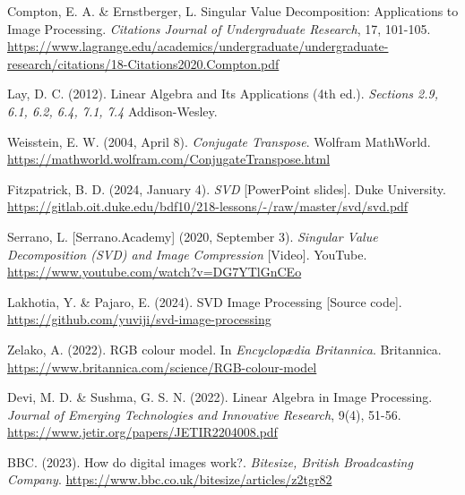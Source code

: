 \documentclass[12pt, reqno]{amsart}
\theoremstyle{definition}
\theoremstyle{remark}
\numberwithin{equation}{section}
\begin{document}

\begin{thebibliography}{99}

 Compton, E. A. \& Ernstberger, L. Singular Value Decomposition: Applications to Image Processing. \textit{Citations Journal of Undergraduate Research}, 17, 101-105. \url{https://www.lagrange.edu/academics/undergraduate/undergraduate-research/citations/18-Citations2020.Compton.pdf}

 Lay, D. C. (2012). Linear Algebra and Its Applications (4th ed.). \textit{Sections 2.9, 6.1, 6.2, 6.4, 7.1, 7.4} Addison-Wesley.

 Weisstein, E. W. (2004, April 8). \textit{Conjugate Transpose}. Wolfram MathWorld. \url{https://mathworld.wolfram.com/ConjugateTranspose.html}

 Fitzpatrick, B. D. (2024, January 4). \textit{SVD} [PowerPoint slides]. Duke University.\\
\url{https://gitlab.oit.duke.edu/bdf10/218-lessons/-/raw/master/svd/svd.pdf}

 Serrano, L. [Serrano.Academy] (2020, September 3). \textit{Singular Value Decomposition (SVD) and Image Compression} [Video]. YouTube.
\url{https://www.youtube.com/watch?v=DG7YTlGnCEo}

 Lakhotia, Y. \& Pajaro, E. (2024). SVD Image Processing [Source code].
\url{https://github.com/yuviji/svd-image-processing}

 Zelako, A. (2022). RGB colour model. In \textit{Encyclopædia Britannica}. Britannica.
\url{https://www.britannica.com/science/RGB-colour-model}

 Devi, M. D. \& Sushma, G. S. N. (2022). Linear Algebra in Image Processing. \textit{Journal of Emerging Technologies and Innovative Research}, 9(4), 51-56.
\url{https://www.jetir.org/papers/JETIR2204008.pdf}

 BBC. (2023). How do digital images work?. \textit{Bitesize, British Broadcasting Company}.
\url{https://www.bbc.co.uk/bitesize/articles/z2tgr82}

\end{thebibliography}
\end{document}
